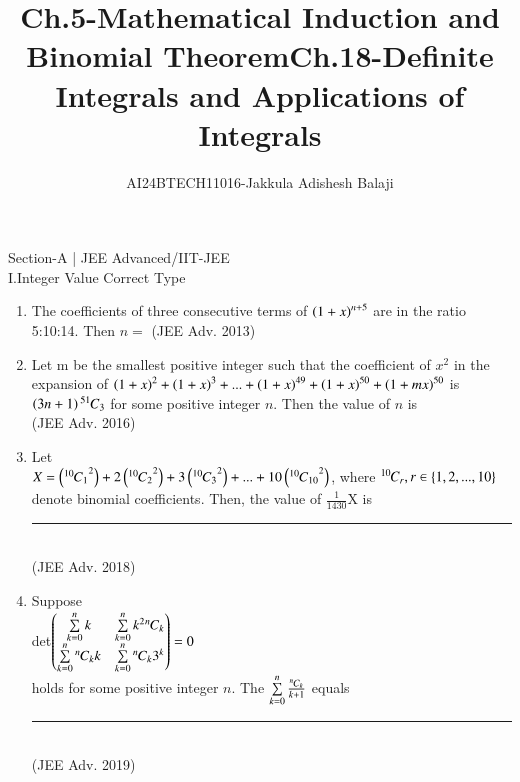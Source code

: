 \documentclass[journal]{IEEEtran}
\begin{document}

\title{Ch.5-Mathematical Induction and Binomial Theorem}
\author{AI24BTECH11016-Jakkula Adishesh Balaji}
{\let\newpage\relax\maketitle}
\renewcommand{\thefigure}{\theenumi}
\renewcommand{\thetable}{\theenumi}
\setlength{\intextsep}{10pt} %
\renewcommand{\thetable}{\theenumi}
Section-A | JEE Advanced/IIT-JEE\\
 I.Integer Value Correct Type
\begin{enumerate}
        \item
            The coefficients of three consecutive terms of $\left(1+x\right)^{n+5}$ are in the ratio 5:10:14. Then $n=$       
                     \hfill(JEE Adv. 2013)
        \item
            Let m be the smallest positive integer such that the coefficient of $x^{2}$ in the expansion of $\left(1+x\right)^{2} + \left(1+x\right)^{3} + ... + \left(1+x\right)^{49} + \left(1+x\right)^{50} + \left(1+mx\right)^{50}$ is $\left(3n+1\right) {{}^{51}\mkern-1muC_{3}}$ for some positive integer $n$. Then the value of $n$ is \\
                     \hfill(JEE Adv. 2016)
        \item
            Let \\ $X= \left({{}^{10}\mkern-1muC_{1}}^{2}\right)+2\left({{}^{10}\mkern-1muC_{2}}^{2}\right) + 3\left({{}^{10}\mkern-1muC_{3}}^{2}\right) + ... + 10\left({{}^{10}\mkern-1muC_{10}}^{2}\right)$, where ${{}^{10}\mkern-1muC_{r}} , r \in \left\{1,2,...,10\right\}$ denote binomial coefficients. Then, the value of $\frac{1}{1430}$X is \rule{10mm}{0.15mm} \\
                    \hfill(JEE Adv. 2018)
        \item
        Suppose \\
           det$\begin{pmatrix} \sum\limits_{k=0}^{n}k & \sum\limits_{k=0}^{n} k^{2} {{}^{n}\mkern-1muC_{k}} \\ \sum\limits_{k=0}^{n}{{}^{n}\mkern-1muC_{k}} k & \sum\limits_{k=0}^{n}{{}^{n}\mkern-1muC_{k}} 3^{k}\end{pmatrix}=0$ \\
holds for some positive integer $n$. The $\sum\limits_{k=0}^{n} \frac{{{}^{n}\mkern-1muC_{k}}}{k+1}$ equals \rule{10mm}{0.15mm} \\
                    \hfill(JEE Adv. 2019)
\end{enumerate}
\newpage
\title{Ch.18-Definite Integrals and Applications of Integrals}
\maketitle
\end{document}
